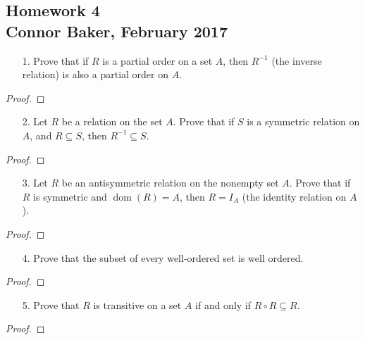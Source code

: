 \documentclass[10pt]{article}
\theoremstyle{definition}
\theoremstyle{plain}
\DeclareMathOperator\dom{dom}
\begin{document}
\begin{center}
  \subsection*{Homework 4\\Connor Baker, February 2017}
\end{center}

\begin{enumerate}
\item[1.] Prove that if $R$ is a partial order on a set $A$, then $R^{-1}$ (the inverse relation) is also a partial order on $A$.
\end{enumerate}

\begin{proof}
\end{proof}



\pagebreak



\begin{enumerate}
  \item[2.] Let $R$ be a relation on the set $A$.  Prove that if $S$ is a symmetric relation on $A$, and $R \subseteq S$, then $R^{-1} \subseteq S$.
\end{enumerate}

\begin{proof}
\end{proof}



\pagebreak



\begin{enumerate}
  \item[3.] Let $R$ be an antisymmetric relation on the nonempty set $A$.  Prove that if $R$ is symmetric and $\dom(R) = A$, then $R = I_A$ (the identity relation on $A$).
\end{enumerate}

\setcounter{equation}{0}
\begin{proof}
\end{proof}



\pagebreak



\begin{enumerate}
  \item[4.] Prove that the subset of every well-ordered set is well ordered.
\end{enumerate}

\setcounter{equation}{0}
\begin{proof}
\end{proof}



\pagebreak



\begin{enumerate}
  \item[5.] Prove that $R$ is transitive on a set $A$ if and only if $R \circ R \subseteq R$.
\end{enumerate}

\setcounter{equation}{0}
\begin{proof}
\end{proof}
\end{document}

